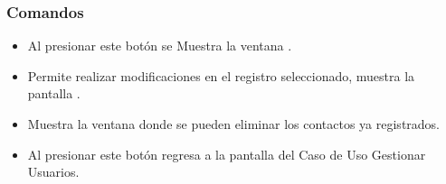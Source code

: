 \subsubsection{Comandos}
\begin{itemize}
 \item {} Al presionar este botón se Muestra la ventana .
 \item {} Permite realizar modificaciones en el registro seleccionado, muestra la pantalla .
 \item {} Muestra la ventana  donde se pueden eliminar los contactos ya registrados.
 \item {} Al presionar este botón regresa a la pantalla del Caso de Uso Gestionar Usuarios.
\end{itemize}


